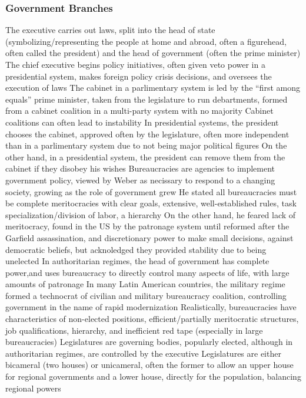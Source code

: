\documentclass[11 pt, twoside]{article}
\newenvironment{outline*}
{
	\begin{outline}[enumerate]
	}
	{\end{outline}
}
\begin{document}
\subsubsection{Government Branches}
\begin{outline*}
\1 The executive carries out laws, split into the head of state (symbolizing/representing the people at home and abroad, often a figurehead, often called the president) and the head of government (often the prime minister)
\2 The chief executive begins policy initiatives, often given veto power in a presidential system, makes foreign policy crisis decisions, and oversees the execution of laws
\2 The cabinet in a parlimentary system is led by the ``first among equals'' prime minister, taken from the legislature to run debartments, formed from a cabinet coalition in a multi-party system with no majority
\3 Cabinet coalitions can often lead to instability
\3 In presidential systems, the president chooses the cabinet, approved often by the legislature, often more independent than in a parlimentary system due to not being major political figures
\3 On the other hand, in a presidential system, the president can remove them from the cabinet if they disobey his wishes
\2 Bureaucracies are agencies to implement government policy, viewed by Weber as necissary to respond to a changing society, growing as the role of government grew
\3 He stated all bureaucracies must be complete meritocracies with clear goals, extensive, well-established rules, task specialization/division of labor, a hierarchy
\3 On the other hand, he feared lack of meritocracy, found in the US by the patronage system until reformed after the Garfield assassination, and discretionary power to make small decisions, against democratic beliefs, but acknoledged they provided stability due to being unelected
\3 In authoritarian regimes, the head of government has complete power,and uses bureaucracy to directly control many aspects of life, with large amounts of patronage
\3 In many Latin American countries, the military regime formed a technocrat of civilian and military bureaucracy coalition, controlling government in the name of rapid modernization
\3 Realistically, bureaucracies have characteristics of non-elected positions, efficient/partially meritocratic structures, job qualifications, hierarchy, and inefficient red tape (especially in large bureaucracies)
\1 Legislatures are governing bodies, popularly elected, although in authoritarian regimes, are controlled by the executive
\2 Legislatures are either bicameral (two houses) or unicameral, often the former to allow an upper house for regional governments and a lower house, directly for the population, balancing regional powers

\end{outline*}
\end{document}
